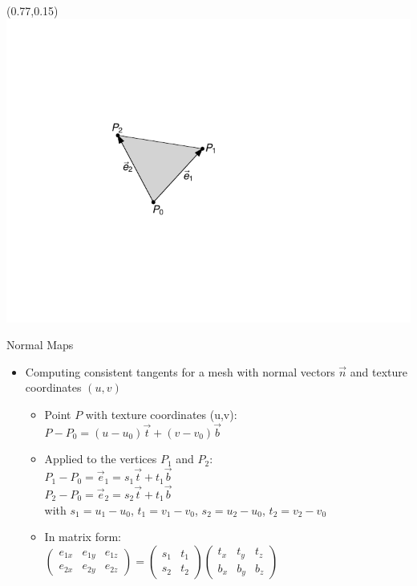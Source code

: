 \documentclass[utf8,stillsansserifmath,fleqn,t]{beamer}
\newcommand{\ds}{\displaystyle}
\begin{document}
\begin{frame}
\frametitle{\insertsection}
\begin{textblock}{0.23}(0.77,0.15)\includegraphics[width=\textwidth]{./fig/tangentspace-computation.pdf}\end{textblock}
Normal Maps
\begin{itemize}
\item Computing consistent tangents for a mesh with normal vectors $\vec{n}$
and texture coordinates $(u,v)$
    \begin{itemize}
    \item Point $P$ with texture coordinates (u,v):
    $P-P_0=(u-u_0)\vec{t} + (v-v_0)\vec{b}$
    \item Applied to the vertices $P_1$ and $P_2$:\\
    $P_1-P_0=\vec{e}_1=s_1\vec{t} + t_1\vec{b}$\\
    $P_2-P_0=\vec{e}_2=s_2\vec{t} + t_1\vec{b}$\\
    with $s_1 = u_1 - u_0$, $t_1 = v_1 - v_0$, $s_2 = u_2 - u_0$, $t_2 = v_2 - v_0$
    \item In matrix form:\\
    $\ds \begin{pmatrix}e_{1x} & e_{1y} & e_{1z}\\ e_{2x} & e_{2y} & e_{2z}\end{pmatrix}
    = \begin{pmatrix}s_1 & t_1\\s_2 & t_2\end{pmatrix}
    \begin{pmatrix}t_x & t_y & t_z\\ b_x & b_y & b_z \end{pmatrix}$

\end{itemize}
\end{itemize}
\end{frame}
\end{document}
